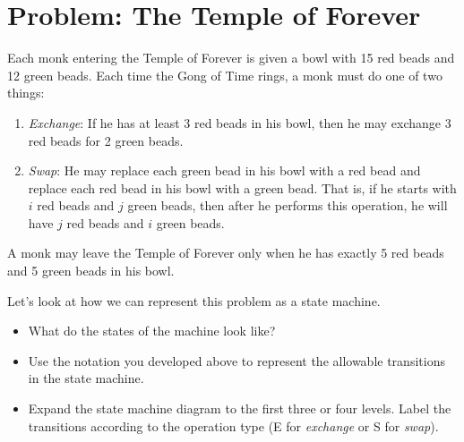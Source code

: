 \documentclass[12pt]{article}
\begin{document}
\newpage
\section{Problem: The Temple of Forever}

Each monk entering the Temple of Forever is given a bowl with 15 red
beads and 12 green beads.  Each time the Gong of Time rings, a monk
must do one of two things:

\begin{enumerate}

\item {\em Exchange}: If he has at least 3 red beads in his bowl, then he may exchange 3
red beads for 2 green beads.

\item {\em Swap}: He may replace each green bead in his bowl with a red bead and
replace each red bead in his bowl with a green bead.
That is, if he starts with $i$ red beads and $j$ green beads, then after he
performs this operation, he will have $j$ red beads and $i$ green beads.

\end{enumerate}

\noindent A monk may leave the Temple of Forever only when he has
exactly 5 red beads and 5 green beads in his bowl.

Let's look at how we can represent this problem as a state machine.

\begin{itemize}

\item 
What do the states of the machine look like? 

\item
Use the notation you developed above to represent the allowable
transitions in the state machine.


\item Expand the state machine diagram to the first three or four
  levels. Label the transitions according to the operation type (E for
  {\em exchange} or S for {\em swap}).


\end{itemize}
\end{document}
